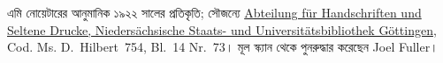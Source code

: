 এমি নোয়েটারের আনুমানিক ১৯২২ সালের প্রতিকৃতি; সৌজন্যে
\href{http://www.sub.uni-goettingen.de/en/contact/departments-a-z/departmental-and-unit-details/abteilunggruppe/handschriften-und-seltene-drucke/}{Abteilung
f\"ur Handschriften und Seltene Drucke, Nieders\"achsische Staats- und
Universit\"atsbibliothek G\"ottingen}, Cod. Ms. D.~Hilbert~754, Bl.~14 Nr.~73।
মূল স্ক্যান থেকে পুনরুদ্ধার করেছেন Joel Fuller।
